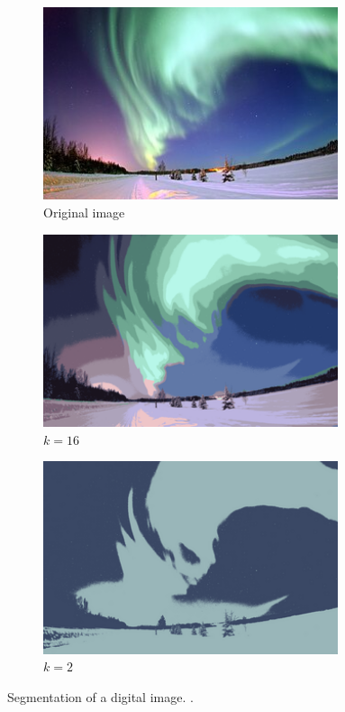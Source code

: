 \documentclass{report}
\begin{document}
\begin{figure}
    \centering
    \begin{subfigure}{0.3\textwidth}
        \includegraphics[width=0.95\textwidth]{kmeansreal1.jpg}
        \caption{Original image}
    \end{subfigure}
    \begin{subfigure}{0.3\textwidth}
        \includegraphics[width=0.95\textwidth]{kmeansreal2.png}
        \caption{$k=16$}
    \end{subfigure}
    \begin{subfigure}{0.3\textwidth}
        \includegraphics[width=0.95\textwidth]{kmeansreal3.png}
        \caption{$k=2$}
    \end{subfigure}
    \caption{Segmentation of a digital image. \cite{kmeanspicreal}.}
    \label{fig:kmeansreal}
\end{figure}
\end{document}

